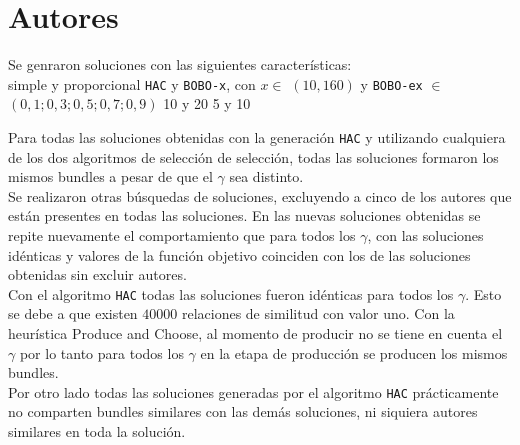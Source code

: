 \section{Autores}
Se genraron soluciones con las siguientes características:\\
\Solucion
{}
{simple y proporcional}
{\texttt{HAC} y \texttt{BOBO-x}, con  $x \in$ $(10, 160)$ y \texttt{BOBO-ex}}
{$\in$ $(0,1; 0,3; 0,5; 0,7; 0,9)$}
{10 y 20}
{5 y 10}

Para todas las soluciones obtenidas con la generación \texttt{HAC} y utilizando cualquiera de los 
dos algoritmos de selección de selección, todas las soluciones formaron los mismos bundles a 
pesar de que el $\gamma$ sea distinto.\\ 
Se realizaron otras búsquedas de soluciones, excluyendo a cinco de los autores que están presentes 
en todas las soluciones. En las nuevas soluciones obtenidas se repite nuevamente el comportamiento 
que para todos los $\gamma$, con las soluciones idénticas y valores de la función objetivo coinciden 
con los de las soluciones obtenidas sin excluir autores.\\
Con el algoritmo \texttt{HAC} todas las soluciones fueron idénticas para todos los $\gamma$. Esto 
se debe a que existen $40000$ relaciones de similitud con valor uno. Con la heurística Produce and 
Choose, al momento de producir no se tiene en cuenta el $\gamma$ por lo tanto para todos los 
$\gamma$ en la etapa de producción se producen los mismos bundles.\\
Por otro lado todas las soluciones generadas por el algoritmo \texttt{HAC} prácticamente no 
comparten bundles similares con las demás soluciones, ni siquiera autores similares en toda la 
solución.


